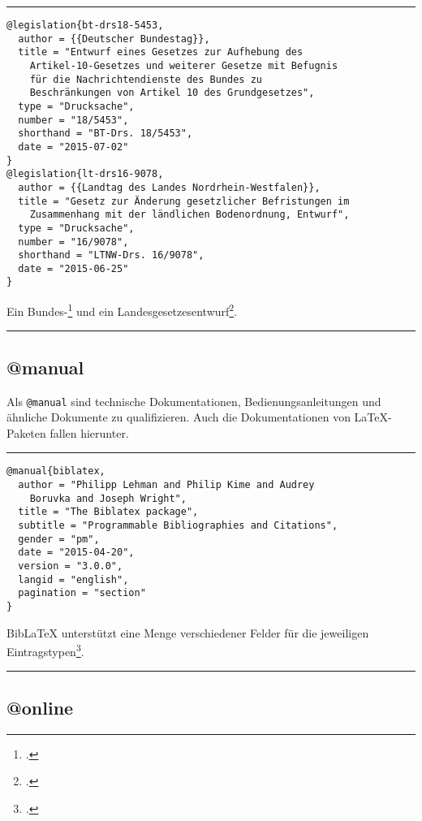 \documentclass[11pt,a4paper,DIV=calc]{scrartcl}
\newcommand\software[1]{\textsf{#1}}
\newcommand\Biblatex{\software{Bib\LaTeX{}}\xspace}
\newenvironment{rubexample}{\par\vspace{\baselineskip}\hrule\par\begin{refsection}}{\end{refsection}\par\hrule\par\vspace{\baselineskip}}
\begin{document}
\begin{rubexample}
\begin{verbatim}
@legislation{bt-drs18-5453,
  author = {{Deutscher Bundestag}},
  title = "Entwurf eines Gesetzes zur Aufhebung des
    Artikel-10-Gesetzes und weiterer Gesetze mit Befugnis
    für die Nachrichtendienste des Bundes zu
    Beschränkungen von Artikel 10 des Grundgesetzes",
  type = "Drucksache",
  number = "18/5453",
  shorthand = "BT-Drs. 18/5453",
  date = "2015-07-02"
}
@legislation{lt-drs16-9078,
  author = {{Landtag des Landes Nordrhein-Westfalen}},
  title = "Gesetz zur Änderung gesetzlicher Befristungen im
    Zusammenhang mit der ländlichen Bodenordnung, Entwurf",
  type = "Drucksache",
  number = "16/9078",
  shorthand = "LTNW-Drs. 16/9078",
  date = "2015-06-25"
}
\end{verbatim}

Ein Bundes-\footcite{bt-drs18-5453} und ein
Landesgesetzesentwurf\footcite[9]{lt-drs16-9078}.

\printbibliography
\end{rubexample}

\subsection{@manual}

Als \verb+@manual+ sind technische Dokumentationen,
Bedienungsanleitungen und ähnliche Dokumente zu qualifizieren. Auch
die Dokumentationen von \LaTeX{}-\\Pa\-ke\-ten fallen hierunter.

\begin{rubexample}
\begin{verbatim}
@manual{biblatex,
  author = "Philipp Lehman and Philip Kime and Audrey
    Boruvka and Joseph Wright",
  title = "The Biblatex package",
  subtitle = "Programmable Bibliographies and Citations",
  gender = "pm",
  date = "2015-04-20",
  version = "3.0.0",
  langid = "english",
  pagination = "section"
}
\end{verbatim}

\Biblatex unterstützt eine Menge verschiedener Felder für die
jeweiligen Eintragstypen\footcite[2.2.2]{biblatex}.

\printbibliography
\end{rubexample}

\subsection{@online}
\end{document}
